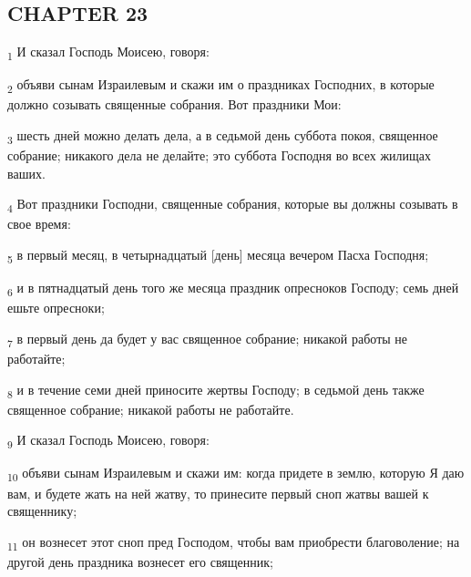 \subsection{CHAPTER 23}
\begin{tcolorbox}
\textsubscript{1} И сказал Господь Моисею, говоря:
\end{tcolorbox}
\begin{tcolorbox}
\textsubscript{2} объяви сынам Израилевым и скажи им о праздниках Господних, в которые должно созывать священные собрания. Вот праздники Мои:
\end{tcolorbox}
\begin{tcolorbox}
\textsubscript{3} шесть дней можно делать дела, а в седьмой день суббота покоя, священное собрание; никакого дела не делайте; это суббота Господня во всех жилищах ваших.
\end{tcolorbox}
\begin{tcolorbox}
\textsubscript{4} Вот праздники Господни, священные собрания, которые вы должны созывать в свое время:
\end{tcolorbox}
\begin{tcolorbox}
\textsubscript{5} в первый месяц, в четырнадцатый [день] месяца вечером Пасха Господня;
\end{tcolorbox}
\begin{tcolorbox}
\textsubscript{6} и в пятнадцатый день того же месяца праздник опресноков Господу; семь дней ешьте опресноки;
\end{tcolorbox}
\begin{tcolorbox}
\textsubscript{7} в первый день да будет у вас священное собрание; никакой работы не работайте;
\end{tcolorbox}
\begin{tcolorbox}
\textsubscript{8} и в течение семи дней приносите жертвы Господу; в седьмой день также священное собрание; никакой работы не работайте.
\end{tcolorbox}
\begin{tcolorbox}
\textsubscript{9} И сказал Господь Моисею, говоря:
\end{tcolorbox}
\begin{tcolorbox}
\textsubscript{10} объяви сынам Израилевым и скажи им: когда придете в землю, которую Я даю вам, и будете жать на ней жатву, то принесите первый сноп жатвы вашей к священнику;
\end{tcolorbox}
\begin{tcolorbox}
\textsubscript{11} он вознесет этот сноп пред Господом, чтобы вам приобрести благоволение; на другой день праздника вознесет его священник;
\end{tcolorbox}
